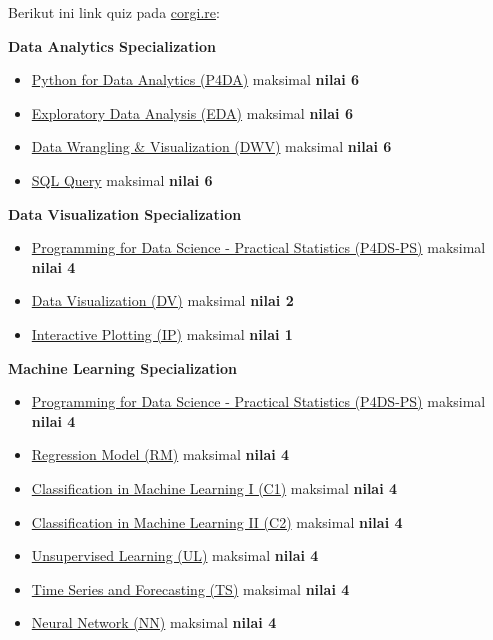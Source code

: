 \documentclass[
]{book}
\providecommand{\tightlist}{%
  \setlength{\itemsep}{0pt}\setlength{\parskip}{0pt}}
\begin{document}
Berikut ini link quiz pada \url{corgi.re}:

\textbf{Data Analytics Specialization}

\begin{itemize}
\tightlist
\item
  \href{https://corgi.re/courses/ttnsy/quiz_PYW1}{Python for Data Analytics (P4DA)} maksimal \textbf{nilai 6}
\item
  \href{https://corgi.re/courses/ttnsy/quiz_PYW2}{Exploratory Data Analysis (EDA)} maksimal \textbf{nilai 6}
\item
  \href{https://corgi.re/courses/ttnsy/quiz_PYW3}{Data Wrangling \& Visualization (DWV)} maksimal \textbf{nilai 6}
\item
  \href{https://corgi.re/courses/ttnsy/quiz_PYW4}{SQL Query} maksimal \textbf{nilai 6}
\end{itemize}

\textbf{Data Visualization Specialization}

\begin{itemize}
\tightlist
\item
  \href{https://corgi.re/courses/Davidlimbong/P4DS-PS}{Programming for Data Science - Practical Statistics (P4DS-PS)} maksimal \textbf{nilai 4}
\item
  \href{https://corgi.re/courses/Argaadya/Data-visualization}{Data Visualization (DV)} maksimal \textbf{nilai 2}
\item
  \href{https://corgi.re/courses/Davidlimbong/InteractivePlotting}{Interactive Plotting (IP)} maksimal \textbf{nilai 1}
\end{itemize}

\textbf{Machine Learning Specialization}

\begin{itemize}
\tightlist
\item
  \href{https://corgi.re/courses/Davidlimbong/P4DS-PS}{Programming for Data Science - Practical Statistics (P4DS-PS)} maksimal \textbf{nilai 4}
\item
  \href{https://corgi.re/courses/ahmadhusain/regressionmodels}{Regression Model (RM)} maksimal \textbf{nilai 4}
\item
  \href{https://corgi.re/courses/inytss/classification1}{Classification in Machine Learning I (C1)} maksimal \textbf{nilai 4}
\item
  \href{https://corgi.re/courses/ysitta/classification2}{Classification in Machine Learning II (C2)} maksimal \textbf{nilai 4}
\item
  \href{https://corgi.re/courses/Davidlimbong/UnsupervisedLearning}{Unsupervised Learning (UL)} maksimal \textbf{nilai 4}
\item
  \href{https://corgi.re/courses/inytss/time-series}{Time Series and Forecasting (TS)} maksimal \textbf{nilai 4}
\item
  \href{https://corgi.re/courses/ysitta/neural_Network}{Neural Network (NN)} maksimal \textbf{nilai 4}
\end{itemize}
\end{document}

